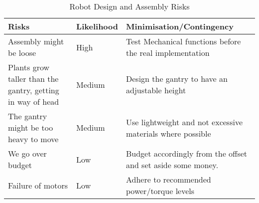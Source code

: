 \begin{table}[H]
\begin{tabular}{ |p{2cm}|p{1.6cm}|p{3.8cm}| }
 \hline
 \textbf{Risks}& \textbf{Likelihood}& \textbf{Minimisation/Contingency}\\
 \hline
 Assembly might be loose & High & Test Mechanical functions before the real implementation\\
 \hline
 Plants grow taller than the gantry, getting in way of head & Medium & Design the gantry to have an adjustable height\\
 \hline
 The gantry might be too heavy to move& Medium& Use lightweight and not excessive materials where possible\\ 
 \hline
 We go over budget & Low & Budget accordingly from the offset and set aside some money. \\
 \hline
 Failure of motors &Low & Adhere to recommended power/torque levels\\
\hline
\end{tabular}
\setlength{\abovecaptionskip}{-2mm}
\setlength{\belowcaptionskip}{-1mm}
\vspace*{-3mm}
\caption{Robot Design and Assembly Risks}
\label{tab:robotrisk}
\vspace{-8mm}
\end{table}

